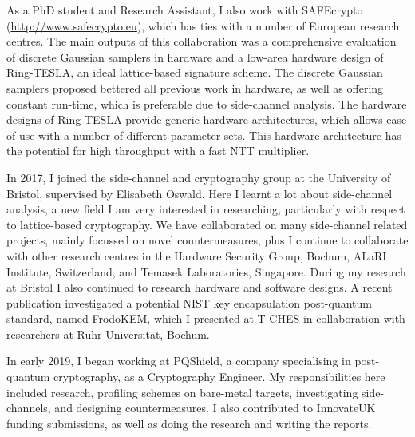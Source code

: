 \documentclass[10pt,a4paper]{moderncv}
\begin{document}
\vspace{0.25cm}

As a PhD student and Research Assistant, I also work with SAFEcrypto (\url{http://www.safecrypto.eu}), which has ties with a number of European research centres. The main outputs of this collaboration was a comprehensive evaluation of discrete Gaussian samplers in hardware and a low-area hardware design of Ring-TESLA, an ideal lattice-based signature scheme. The discrete Gaussian samplers proposed bettered all previous work in hardware, as well as offering constant run-time, which is preferable due to side-channel analysis. The hardware designs of Ring-TESLA provide generic hardware architectures, which allows ease of use with a number of different parameter sets. This hardware architecture has the potential for high throughput with a fast NTT multiplier. %

\vspace{0.25cm}

In 2017, I joined the side-channel and cryptography group at the University of Bristol, supervised by Elisabeth Oswald. Here I learnt a lot about side-channel analysis, a new field I am very interested in researching, particularly with respect to lattice-based cryptography. We have collaborated on many side-channel related projects, mainly focussed on novel countermeasures, plus I continue to collaborate with other research centres in the Hardware Security Group, Bochum, ALaRI Institute, Switzerland, and Temasek Laboratories, Singapore. During my research at Bristol I also continued to research hardware and software designs. A recent publication investigated a potential NIST key encapsulation post-quantum standard, named FrodoKEM, which I presented at T-CHES in collaboration with researchers at Ruhr-Universit\"{a}t, Bochum.

\vspace{0.25cm}

In early 2019, I began working at PQShield, a company specialising in post-quantum cryptography, as a Cryptography Engineer. My responsibilities here included research, profiling schemes on bare-metal targets, investigating side-channels, and designing countermeasures. I also contributed to InnovateUK funding submissions, as well as doing the research and writing the reports.

\vspace{0.25cm}
\end{document}
